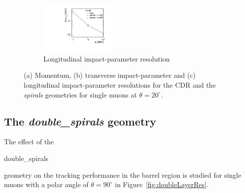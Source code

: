\begin{figure}[H]
\begin{subfigure}[b]{\textwidth}
          \centering
          \includegraphics[width=0.4\textwidth]{Figures/Geometries/z0_resolution_spirals.pdf}
          \caption{Longitudinal impact-parameter resolution}
          \label{}
        \end{subfigure}
        \caption{(a) Momentum, (b) transverse impact-parameter and
          (c) longitudinal impact-parameter resolutions for the CDR and
          the {\it spirals} geometries for single muons at $\theta = 20^\circ$.}\label{fig:spiralRes}
\end{figure}


\subsection{The \emph{double\_spirals} geometry}
The effect of the \begin{it}double\_spirals\end{it} geometry on the tracking performance in the barrel region is studied for single muons with a polar angle of $\theta=90^\circ$ in Figure~\ref{fig:doubleLayerRes}.


